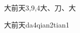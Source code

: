 \begin{entry}{大前天}{3,9,4}{⼤、⼑、⼤}
  \begin{phonetics}{大前天}{da4qian2tian1}
  \end{phonetics}
\end{entry}
